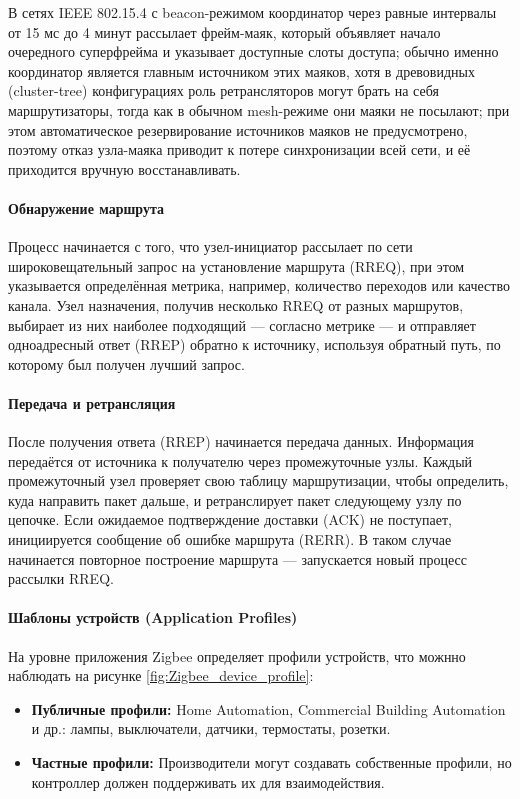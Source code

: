 \documentclass[14pt,a4paper]{extarticle}
\begin{document}
В сетях IEEE 802.15.4 с beacon-режимом координатор через равные интервалы от 15 мс до 4 минут рассылает фрейм-маяк, который объявляет начало очередного суперфрейма и указывает доступные слоты доступа\cite{IEEE802_15_4_2020}; обычно именно координатор является главным источником этих маяков, хотя в древовидных (cluster-tree) конфигурациях роль ретрансляторов могут брать на себя маршрутизаторы, тогда как в обычном mesh-режиме они маяки не посылают; при этом автоматическое резервирование источников маяков не предусмотрено, поэтому отказ узла-маяка приводит к потере синхронизации всей сети, и её приходится вручную восстанавливать.


\paragraph{Обнаружение маршрута} Процесс начинается с того, что узел-инициатор рассылает по сети широковещательный запрос на установление маршрута (RREQ), при этом указывается определённая метрика, например, количество переходов или качество канала.
Узел назначения, получив несколько RREQ от разных маршрутов, выбирает из них наиболее подходящий — согласно метрике — и отправляет одноадресный ответ (RREP) обратно к источнику, используя обратный путь, по которому был получен лучший запрос.

\paragraph{Передача и ретрансляция} После получения ответа (RREP) начинается передача данных. Информация передаётся от источника к получателю через промежуточные узлы. Каждый промежуточный узел проверяет свою таблицу маршрутизации, чтобы определить, куда направить пакет дальше, и ретранслирует пакет следующему узлу по цепочке.
Если ожидаемое подтверждение доставки (ACK) не поступает, инициируется сообщение об ошибке маршрута (RERR). В таком случае начинается повторное построение маршрута — запускается новый процесс рассылки RREQ.


\paragraph{Шаблоны устройств (Application Profiles)}
На уровне приложения Zigbee определяет профили устройств, что можнно наблюдать на рисунке \ref{fig:Zigbee_device_profile}:
\begin{itemize}
 \item \textbf{Публичные профили:} Home Automation, Commercial Building Automation и др.: лампы, выключатели, датчики, термостаты, розетки.
 \item \textbf{Частные профили:} Производители могут создавать собственные профили, но контроллер должен поддерживать их для взаимодействия.
\end{itemize}
\end{document}
